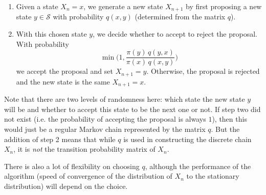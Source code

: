     \begin{enumerate}
      \item Given a state $X_n = x$, we generate a new state $X_{n+1}$ by first proposing a new state $y \in \mathcal{S}$ with probability $q(x, y)$ (determined from the matrix $q$). 
      \item With this chosen state $y$, we decide whether to accept to reject the proposal. With probability 
      \begin{equation}
        \min \bigg( 1, \frac{\pi(y) \,  q(y, x)}{\pi(x) \, q(x, y)} \bigg)
      \end{equation}
      we accept the proposal and set $X_{n+1} = y$. Otherwise, the proposal is rejected and the new state is the same $X_{n+1} = x$. 
    \end{enumerate}

    Note that there are two levels of randomness here: which state the new state $y$ will be and whether to accept this state to be the next one or not. If step two did not exist (i.e. the probability of accepting the proposal is always $1$), then this would just be a regular Markov chain represented by the matrix $q$. But the addition of step 2 means that while $q$ is used in constructing the discrete chain $X_n$, it is \textit{not} the transition probability matrix of $X_n$. 

    There is also a lot of flexibility on choosing $q$, although the performance of the algorithm (speed of convergence of the distribution of $X_n$ to the stationary distribution) will depend on the choice.

